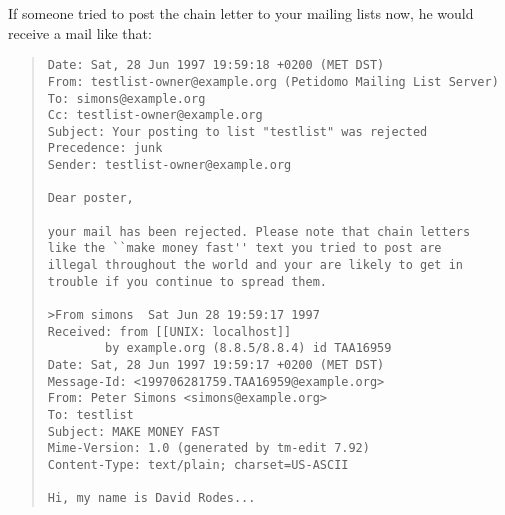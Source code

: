 \documentclass[a4paper,10pt]{scrreprt}
\begin{document}
If someone tried to post the chain letter to your mailing lists now,
he would receive a mail like that:
\begin{quote}
\begin{verbatim}
Date: Sat, 28 Jun 1997 19:59:18 +0200 (MET DST)
From: testlist-owner@example.org (Petidomo Mailing List Server)
To: simons@example.org
Cc: testlist-owner@example.org
Subject: Your posting to list "testlist" was rejected
Precedence: junk
Sender: testlist-owner@example.org

Dear poster,

your mail has been rejected. Please note that chain letters
like the ``make money fast'' text you tried to post are
illegal throughout the world and your are likely to get in
trouble if you continue to spread them.

>From simons  Sat Jun 28 19:59:17 1997
Received: from [[UNIX: localhost]]
        by example.org (8.8.5/8.8.4) id TAA16959
Date: Sat, 28 Jun 1997 19:59:17 +0200 (MET DST)
Message-Id: <199706281759.TAA16959@example.org>
From: Peter Simons <simons@example.org>
To: testlist
Subject: MAKE MONEY FAST
Mime-Version: 1.0 (generated by tm-edit 7.92)
Content-Type: text/plain; charset=US-ASCII

Hi, my name is David Rodes...
\end{verbatim}
\end{quote}
\end{document}

